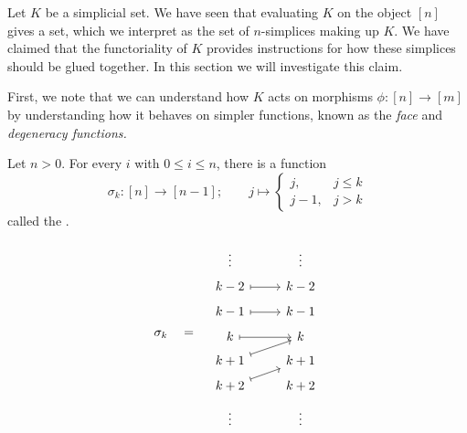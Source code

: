 \documentclass[main.tex]{subfiles}
\begin{document}
Let $K$ be a simplicial set. We have seen that evaluating $K$ on the object $[n]$ gives a set, which we interpret as the set of $n$-simplices making up $K$. We have claimed that the functoriality of $K$ provides instructions for how these simplices should be glued together. In this section we will investigate this claim.

First, we note that we can understand how $K$ acts on morphisms $\phi\colon [n] \to [m]$ by understanding how it behaves on simpler functions, known as the \emph{face} and \emph{degeneracy functions.}

\begin{definition}
  \label{def:degeneracy_function_simplicial_category}
  Let $n > 0$. For every $i$ with $0 \leq i \leq n$, there is a function
  \begin{equation*}
    \sigma_{k}\colon [n] \to [n - 1];\qquad j \mapsto
    \begin{cases}
      j, & j \leq k \\
      j - 1, & j > k
    \end{cases}
  \end{equation*}
  called the .
\end{definition}
\begin{equation*}
  \sigma_{k} \quad = \quad
  \begin{tikzcd}[row sep=tiny]
    \vdots & \vdots
    \\
    k-2
    \arrow[r, mapsto]
    & k-2
    \\
    k-1 
    \arrow[r, mapsto]
    & k-1
    \\
    k 
    \arrow[r, mapsto]
    & k
    \\
    k+1 
    \arrow[ur, mapsto]
    & k+1
    \\
    k+2
    \arrow[ur, mapsto]
    & k+2
    \\
    \vdots & \vdots
  \end{tikzcd}
\end{equation*}
\end{document}
